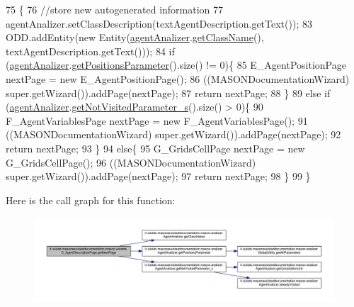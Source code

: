 \begin{DoxyCode}
75                                     \{ 
76         \textcolor{comment}{//store new autogenerated information}
77         agentAnalizer.setClassDescription(textAgentDescription.getText());
83         ODD.addEntity(\textcolor{keyword}{new} Entity(\hyperlink{classit_1_1isislab_1_1masonassisteddocumentation_1_1mason_1_1wizards_1_1_d___agent_description_page_a3551237b74a669c361623caa219af9d7}{agentAnalizer}.\hyperlink{classit_1_1isislab_1_1masonassisteddocumentation_1_1mason_1_1analizer_1_1_agent_analizer_a94492199c5e4873a07a2a46d15617937}{getClassName}(), 
      textAgentDescription.getText()));   
84         \textcolor{keywordflow}{if} (\hyperlink{classit_1_1isislab_1_1masonassisteddocumentation_1_1mason_1_1wizards_1_1_d___agent_description_page_a3551237b74a669c361623caa219af9d7}{agentAnalizer}.\hyperlink{classit_1_1isislab_1_1masonassisteddocumentation_1_1mason_1_1analizer_1_1_agent_analizer_a351c38491d7f706177c4c76478cabd6d}{getPositionsParameter}().size() != 0)\{
85             E\_AgentPositionPage nextPage = \textcolor{keyword}{new} E\_AgentPositionPage();
86             ((MASONDocumentationWizard) super.getWizard()).addPage(nextPage); 
87             \textcolor{keywordflow}{return} nextPage; 
88         \}
89         \textcolor{keywordflow}{else} \textcolor{keywordflow}{if} (\hyperlink{classit_1_1isislab_1_1masonassisteddocumentation_1_1mason_1_1wizards_1_1_d___agent_description_page_a3551237b74a669c361623caa219af9d7}{agentAnalizer}.\hyperlink{classit_1_1isislab_1_1masonassisteddocumentation_1_1mason_1_1analizer_1_1_agent_analizer_ad237f6e49d6d49e0138b1e2ac6a2b0bb}{getNotVisitedParameter\_s}().size() > 0)\{
90             F\_AgentVariablesPage nextPage = \textcolor{keyword}{new} F\_AgentVariablesPage();
91             ((MASONDocumentationWizard) super.getWizard()).addPage(nextPage);
92             \textcolor{keywordflow}{return} nextPage; 
93         \}
94         \textcolor{keywordflow}{else}\{
95             G\_GridsCellPage nextPage = \textcolor{keyword}{new} G\_GridsCellPage();
96             ((MASONDocumentationWizard) super.getWizard()).addPage(nextPage);
97             \textcolor{keywordflow}{return} nextPage; 
98         \}
99     \}
\end{DoxyCode}


Here is the call graph for this function\-:
\nopagebreak
\begin{figure}[H]
\begin{center}
\leavevmode
\includegraphics[width=350pt]{classit_1_1isislab_1_1masonassisteddocumentation_1_1mason_1_1wizards_1_1_d___agent_description_page_acd32a9211894d81e238f54607d7b3f73_cgraph}
\end{center}
\end{figure}


